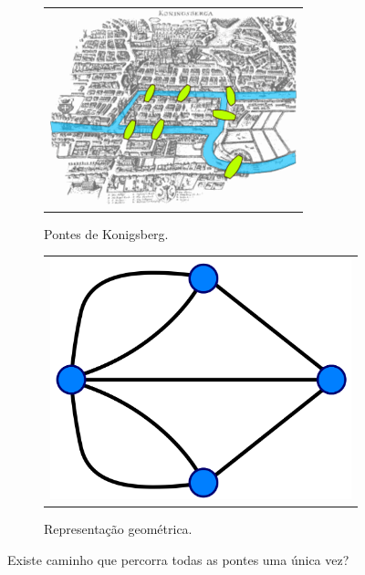 \begin{easylist}
  
\begin{figure}[!h]
  \begin{subfigure}{.5\textwidth}
    \centering
    \begin{tabular}{c}
      \includegraphics[width=1\textwidth]{images/02/Konigsberg_bridges.png}
    \end{tabular}
    \caption{\label{fig:kon:bridges} Pontes de Konigsberg.}
  \end{subfigure}
  \begin{subfigure}{.5\textwidth}
    \centering
    \begin{tabular}{c}
      \includegraphics[width=1\textwidth]{images/02/Konigsberg_graph_svg.png}
    \end{tabular}
    \caption{\label{fig:kon:graph} Representação geométrica.}
  \end{subfigure}
  \caption{\label{fig:gray} Existe caminho que percorra todas as pontes uma única vez?}
\end{figure}



\end{easylist}
